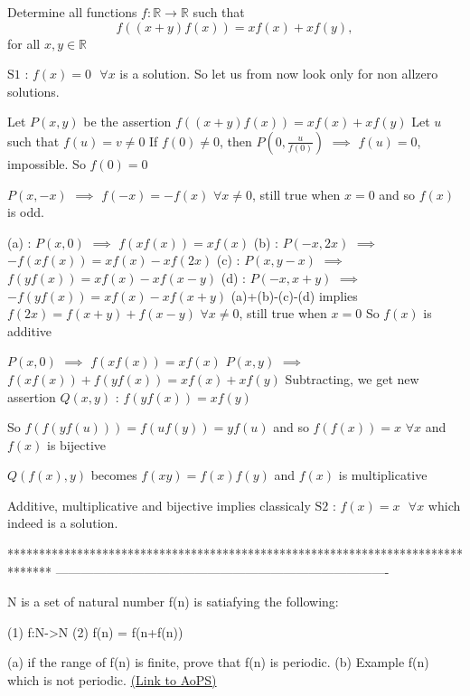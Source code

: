 \begin{solution}
	\begin{tcolorbox}Determine all functions $f : \mathbb{R} \to \mathbb{R}$ such that \[  f((x+y)f(x))=xf(x)+xf(y) ,\] for all $x,y \in \mathbb{R}$\end{tcolorbox}
$\boxed{\text{S1 : }f(x)=0\text{   }\forall x}$ is a solution. So let us from now look only for non allzero solutions.

Let $P(x,y)$ be the assertion $f((x+y)f(x))=xf(x)+xf(y)$
Let $u$ such that $f(u)=v\ne 0$
If $f(0)\ne 0$, then $P(0,\frac u{f(0)})$ $\implies$ $f(u)=0$, impossible. So $f(0)=0$

$P(x,-x)$ $\implies$ $f(-x)=-f(x)$ $\forall x\ne 0$, still true when $x=0$ and so $f(x)$ is odd.

(a) : $P(x,0)$ $\implies$ $f(xf(x))=xf(x)$
(b) : $P(-x,2x)$ $\implies$ $-f(xf(x))=xf(x)-xf(2x)$
(c) : $P(x,y-x)$ $\implies$ $f(yf(x))=xf(x)-xf(x-y)$
(d) : $P(-x,x+y)$ $\implies$ $-f(yf(x))=xf(x)-xf(x+y)$
(a)+(b)-(c)-(d) implies $f(2x)=f(x+y)+f(x-y)$ $\forall x\ne 0$, still true when $x=0$
So $f(x)$ is additive

$P(x,0)$ $\implies$ $f(xf(x))=xf(x)$
$P(x,y)$ $\implies$ $f(xf(x))+f(yf(x))=xf(x)+xf(y)$
Subtracting, we get new assertion $Q(x,y)$ : $f(yf(x))=xf(y)$

So $f(f(yf(u)))=f(uf(y))=yf(u)$ and so $f(f(x))=x$ $\forall x$ and $f(x)$ is bijective

$Q(f(x),y)$ becomes $f(xy)=f(x)f(y)$ and $f(x)$ is multiplicative

Additive, multiplicative and bijective implies classicaly $\boxed{\text{S2 : }f(x)=x\text{   }\forall x}$ which indeed is a solution.
\end{solution}
*******************************************************************************
-------------------------------------------------------------------------------

\begin{problem}
	N is a set of natural number
f(n) is satiafying the following:

   (1) f:N->N 
   (2) f(n) = f(n+f(n))

(a) if the range of f(n) is finite, prove that f(n) is periodic.
(b) Example f(n) which is not periodic.
	\flushright \href{https://artofproblemsolving.com/community/c6h610559}{(Link to AoPS)}
\end{problem}



